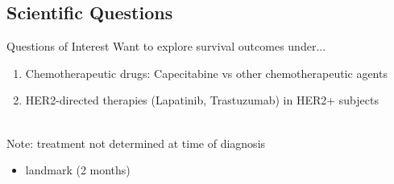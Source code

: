 \subsection{Scientific Questions}
\begin{frame}{Questions of Interest}
Want to explore survival outcomes under...
\begin{enumerate}
 \item Chemotherapeutic drugs: Capecitabine vs other chemotherapeutic agents
 \item HER2-directed therapies (Lapatinib, Trastuzumab) in HER2+ subjects \\~\\
 \end{enumerate}
 
 
 Note: treatment not determined at time of diagnosis 
 \begin{itemize}
  \item landmark (2 months) 
 \end{itemize}
 

\end{frame}


